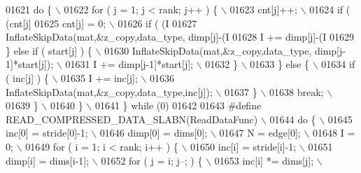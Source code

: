 \begin{DoxyCode}
{{{{{01621 \textcolor{preprocessor}{    do \{ \(\backslash\)}
01622 \textcolor{preprocessor}{        for ( j = 1; j < rank; j++ ) \{ \(\backslash\)}
01623 \textcolor{preprocessor}{            cnt[j]++; \(\backslash\)}
01624 \textcolor{preprocessor}{            if ( (cnt[j] %
01625 \textcolor{preprocessor}{                cnt[j] = 0; \(\backslash\)}
01626 \textcolor{preprocessor}{                if ( (I %
01627 \textcolor{preprocessor}{                    InflateSkipData(mat,&z\_copy,data\_type, dimp[j]-(I %
01628 \textcolor{preprocessor}{                    I += dimp[j]-(I %
01629 \textcolor{preprocessor}{                \} else if ( start[j] ) \{ \(\backslash\)}
01630 \textcolor{preprocessor}{                    InflateSkipData(mat,&z\_copy,data\_type, dimp[j-1]*start[j]); \(\backslash\)}
01631 \textcolor{preprocessor}{                    I += dimp[j-1]*start[j]; \(\backslash\)}
01632 \textcolor{preprocessor}{                \} \(\backslash\)}
01633 \textcolor{preprocessor}{            \} else \{ \(\backslash\)}
01634 \textcolor{preprocessor}{                if ( inc[j] ) \{ \(\backslash\)}
01635 \textcolor{preprocessor}{                    I += inc[j]; \(\backslash\)}
01636 \textcolor{preprocessor}{                    InflateSkipData(mat,&z\_copy,data\_type,inc[j]); \(\backslash\)}
01637 \textcolor{preprocessor}{                \} \(\backslash\)}
01638 \textcolor{preprocessor}{                break; \(\backslash\)}
01639 \textcolor{preprocessor}{            \} \(\backslash\)}
01640 \textcolor{preprocessor}{        \} \(\backslash\)}
01641 \textcolor{preprocessor}{    \} while (0)}
01642 
01643 \textcolor{preprocessor}{#define READ\_COMPRESSED\_DATA\_SLABN(ReadDataFunc) \(\backslash\)}
01644 \textcolor{preprocessor}{    do \{ \(\backslash\)}
01645 \textcolor{preprocessor}{        inc[0]  = stride[0]-1; \(\backslash\)}
01646 \textcolor{preprocessor}{        dimp[0] = dims[0]; \(\backslash\)}
01647 \textcolor{preprocessor}{        N       = edge[0]; \(\backslash\)}
01648 \textcolor{preprocessor}{        I       = 0; \(\backslash\)}
01649 \textcolor{preprocessor}{        for ( i = 1; i < rank; i++ ) \{ \(\backslash\)}
01650 \textcolor{preprocessor}{            inc[i]  = stride[i]-1; \(\backslash\)}
01651 \textcolor{preprocessor}{            dimp[i] = dims[i-1]; \(\backslash\)}
01652 \textcolor{preprocessor}{            for ( j = i; j--; ) \{ \(\backslash\)}
01653 \textcolor{preprocessor}{                inc[i]  *= dims[j]; \(\backslash\)}
}}}}}}}}}
\end{DoxyCode}
